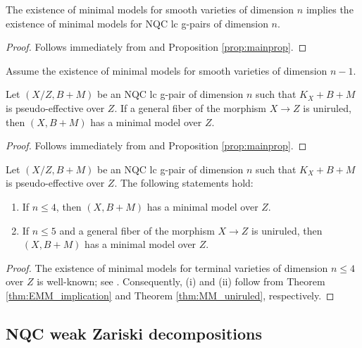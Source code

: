 	\begin{thm} \label{thm:EMM_implication}
		The existence of minimal models for smooth varieties of dimension $n$ implies the existence of minimal models for NQC lc g-pairs of dimension $n$.
	\end{thm}
	
	\begin{proof}
		Follows immediately from \cite[Theorem 4.1(i)]{LT22a} and Proposition \ref{prop:mainprop}.
	\end{proof}
	
	\begin{thm}\label{thm:MM_uniruled}
		Assume the existence of minimal models for smooth varieties of dimension $n-1$.
		
		Let $ (X/Z,B+M) $ be an NQC lc g-pair of dimension $ n $ such that $ K_X+B+M $ is pseudo-effective over $ Z $. If a general fiber of the morphism $ X \to Z $ is uniruled, then $(X,B+M)$ has a minimal model over $Z$.
	\end{thm}
	
	\begin{proof}
		Follows immediately from \cite[Theorem 4.3]{LT22a} and Proposition \ref{prop:mainprop}.
	\end{proof}
	
	\begin{cor}\label{cor:maincor_I}
		Let $ (X/Z,B+M) $ be an NQC lc g-pair of dimension $ n $ such that $ K_X+B+M$ is pseudo-effective over $ Z $. The following statements hold:
		\begin{enumerate}[\normalfont (i)]
			\item If $n \leq 4$, then $ (X,B+M) $ has a minimal model over $Z$.
			
			\item If $n \leq 5$ and a general fiber of the morphism $ X\to Z $ is uniruled, then $ (X,B+M) $ has a minimal model over $Z$.
		\end{enumerate}
	\end{cor}
	
	\begin{proof}
		The existence of minimal models for terminal varieties of dimension $ n \leq 4 $ over $ Z $ is well-known; see \cite[Theorem 5-1-15]{KMM87}. Consequently, (i) and (ii) follow from Theorem \ref{thm:EMM_implication} and Theorem \ref{thm:MM_uniruled}, respectively.
	\end{proof}
	
	
	\subsection{NQC weak Zariski decompositions}
	\label{subsection:NQC_WZD}
	

